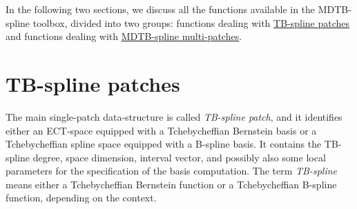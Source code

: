 \documentclass[10pt]{acmtrans2e}
\begin{document}
In the following two sections, we discuss all the functions available in the MDTB-spline toolbox, divided into two groups: functions dealing with \hyperref[sec:matlab-tb]{TB-spline patches} and functions dealing with \hyperref[sec:matlab-mdtb]{MDTB-spline multi-patches}. 


\section{TB-spline patches}\label{sec:matlab-tb}

The main single-patch data-structure is called \emph{TB-spline patch}, and it identifies either an ECT-space equipped with a Tchebycheffian Bernstein basis or a Tchebycheffian spline space equipped with a B-spline basis. It contains the TB-spline degree, space dimension, interval vector, and possibly also some local parameters for the specification of the basis computation. The term \emph{TB-spline} means either a Tchebycheffian Bernstein function or a Tchebycheffian B-spline function, depending on the context. 
\end{document}
